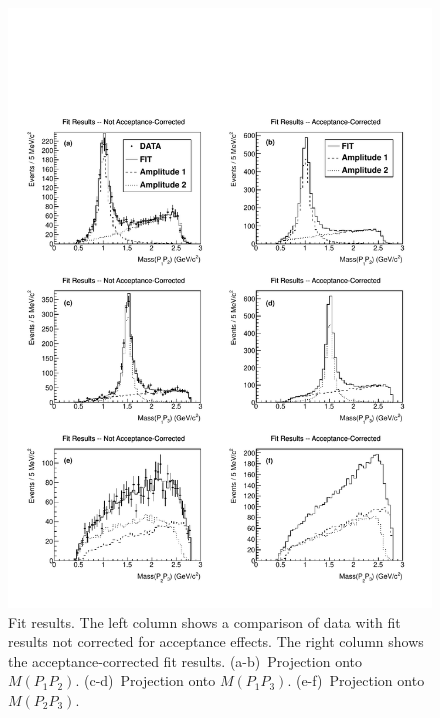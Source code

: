 \documentclass[11pt]{article}
\begin{document}
\newpage
\begin{figure}[h!]
\begin{center}
\includegraphics[width=1.0\columnwidth]{figure2.pdf}
\caption{Fit results.  The left column shows a comparison of data with fit results not corrected for acceptance effects.  The right column shows the acceptance-corrected fit results.  (a-b)~Projection onto $M(P_1P_2)$.  (c-d)~Projection onto $M(P_1P_3)$.  (e-f)~Projection onto $M(P_2P_3)$.
\label{fig:results}}
\end{center}
\end{figure}
\end{document}
